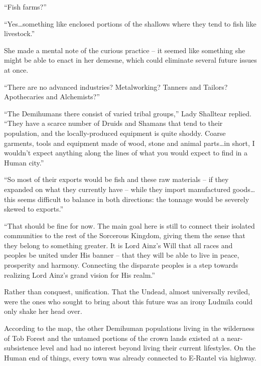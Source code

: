  

“Fish farms?”

 

“Yes…something like enclosed portions of the shallows where they tend to fish like livestock.”

 

She made a mental note of the curious practice – it seemed like something she might be able to enact in her demesne, which could eliminate several future issues at once.

 

“There are no advanced industries? Metalworking? Tanners and Tailors? Apothecaries and Alchemists?”

 

“The Demihumans there consist of varied tribal groups,” Lady Shalltear replied. “They have a scarce number of Druids and Shamans that tend to their population, and the locally-produced equipment is quite shoddy. Coarse garments, tools and equipment made of wood, stone and animal parts…in short, I wouldn’t expect anything along the lines of what you would expect to find in a Human city.”

 

“So most of their exports would be fish and these raw materials – if they expanded on what they currently have – while they import manufactured goods…this seems difficult to balance in both directions: the tonnage would be severely skewed to exports.”

 

“That should be fine for now. The main goal here is still to connect their isolated communities to the rest of the Sorcerous Kingdom, giving them the sense that they belong to something greater. It is Lord Ainz’s Will that all races and peoples be united under His banner – that they will be able to live in peace, prosperity and harmony. Connecting the disparate peoples is a step towards realizing Lord Ainz’s grand vision for His realm.”

 

Rather than conquest, unification. That the Undead, almost universally reviled, were the ones who sought to bring about this future was an irony Ludmila could only shake her head over.

 

According to the map, the other Demihuman populations living in the wilderness of Tob Forest and the untamed portions of the crown lands existed at a near-subsistence level and had no interest beyond living their current lifestyles. On the Human end of things, every town was already connected to E-Rantel via highway.

